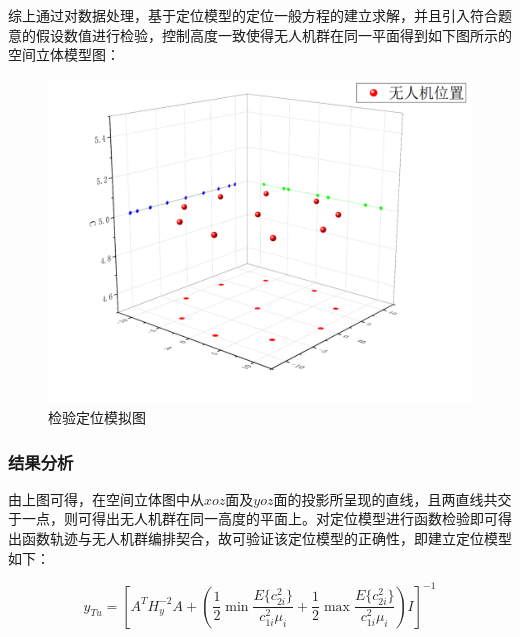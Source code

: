 综上通过对数据处理，基于定位模型的定位一般方程的建立求解，并且引入符合题意的假设数值进行检验，控制高度一致使得无人机群在同一平面得到如下图所示的空间立体模型图：

\begin{figure}
    \centering
    \includegraphics{res/PositionTheModelStereogram.png}
    \caption{检验定位模拟图}
\end{figure}

\subsubsection{结果分析}

由上图可得，在空间立体图中从$xoz$面及$yoz$面的投影所呈现的直线，且两直线共交于一点，则可得出无人机群在同一高度的平面上。对定位模型进行函数检验即可得出函数轨迹与无人机群编排契合，故可验证该定位模型的正确性，即建立定位模型如下：

\begin{equation}
    y_{Tu} = 
    \left[
        A^T H_y^{-2} A + \left(
            \frac{1}{2} \min\frac{E\{c_{2i}^2\}}{c_{1i}^2\mu_i} +
            \frac{1}{2} \max\frac{E\{c_{2i}^2\}}{c_{1i}^2\mu_i}
        \right)I
    \right]^{-1}
\end{equation}













